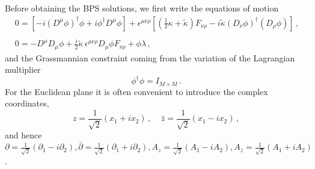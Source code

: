 \documentclass[a4paper,12pt]{article}
\def\I_M{{I_{\scriptscriptstyle M\times M}}}
\def\const{{\tilde{\kappa}}}
\begin{document}
Before obtaining the BPS solutions, we first write  the equations of motion
\begin{eqnarray}\label{eom}
&0=\left[-i(D^{\mu}\phi)^{\dagger}\phi+i\phi^{\dagger} D^{\mu}\phi\right]
+\epsilon^{\mu\nu\rho}\left[(\displaystyle{\frac{1}{2}}\kappa
+\const) F_{\nu\rho}-i \const (D_\nu \phi)^\dagger
(D_\rho \phi)\right]\,,&
\label{eqm1}\\
{}\nonumber\\
&0=-D^{\mu}D_{\mu}\phi+\displaystyle{\frac{i}{2}}\const\,\epsilon^{\mu\nu\rho}D_{\mu}\phi
F_{\nu\rho}+\phi\lambda\,,&
\label{eqm2}
\end{eqnarray}
and the Grassmannian constraint coming from the variation of the Lagrangian multiplier
\begin{equation}
\phi^{\dagger}\phi=\I_M\,.
\label{eqm3}
\end{equation}
For the Euclidean plane it is often convenient to introduce the complex
coordinates,
\begin{equation}
z=\frac{1}{\sqrt{2}}(x_{1}+ix_{2})\,,~~~~~\bar{z}=\frac{1}{\sqrt{2}}(x_{1}-ix_{2})\,,
\end{equation}
and hence $\partial=\frac{1}{\sqrt{2}}(\partial_{1}-i\partial_{2}),
\bar{\partial}=\frac{1}{\sqrt{2}}(\partial_{1}+i\partial_{2}),
A_{z}=\frac{1}{\sqrt{2}}(A_{1}-iA_{2}), A_{\bar{z}}=\frac{1}{\sqrt{2}}(A_{1}+iA_{2})$.\newline
\end{document}
